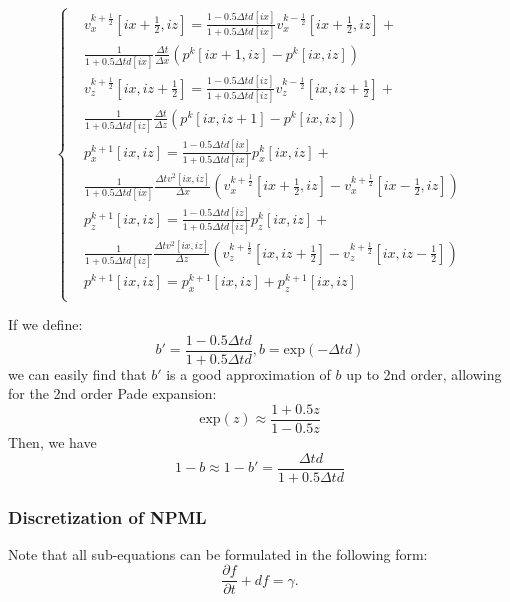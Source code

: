 \begin{equation}
\left\{
\begin{split}
&v_x^{k+\frac{1}{2}}[ix+\frac{1}{2},iz]=\frac{1-0.5\Delta td[ix]}{1+0.5\Delta t d[ix]}v_x^{k-\frac{1}{2}}[ix+\frac{1}{2},iz]+\\
&\frac{1}{1+0.5\Delta t d[ix]}\frac{\Delta t }{\Delta x}(p^k[ix+1,iz]-p^k[ix,iz])\\
&v_z^{k+\frac{1}{2}}[ix,iz+\frac{1}{2}]=\frac{1-0.5\Delta td[iz]}{1+0.5\Delta t d[iz]}v_z^{k-\frac{1}{2}}[ix,iz+\frac{1}{2}]+\\
&\frac{1}{1+0.5\Delta t d[iz]}\frac{\Delta t }{\Delta z}(p^k[ix,iz+1]-p^k[ix,iz])\\
&p_x^{k+1}[ix,iz]=\frac{1-0.5\Delta td[ix]}{1+0.5\Delta t d[ix]}p_x^{k}[ix,iz]+\\
&\frac{1}{1+0.5\Delta t d[ix]}\frac{\Delta t v^2[ix,iz]}{\Delta x}(v_x^{k+\frac{1}{2}}[ix+\frac{1}{2},iz]-v_x^{k+\frac{1}{2}}[ix-\frac{1}{2},iz])\\
&p_z^{k+1}[ix,iz]=\frac{1-0.5\Delta td[iz]}{1+0.5\Delta t d[iz]}p_z^{k}[ix,iz]+\\
&\frac{1}{1+0.5\Delta t d[iz]}\frac{\Delta t v^2[ix,iz]}{\Delta z}(v_z^{k+\frac{1}{2}}[ix,iz+\frac{1}{2}]-v_z^{k+\frac{1}{2}}[ix,iz-\frac{1}{2}])\\
&p^{k+1}[ix,iz]=p_x^{k+1}[ix,iz]+p_z^{k+1}[ix,iz]\\
\end{split}
\right.
\end{equation}

If we define: 
\begin{equation}
 b'=\frac{1-0.5\Delta t d}{1+0.5\Delta t d}, b=\mathrm{exp}(-\Delta t d)
\end{equation}
we can easily find that $b'$ is a good approximation of $b$ up to 2nd order, allowing for the 2nd order Pade expansion:
\begin{equation}
 \mathrm{exp}(z)\approx \frac{1+0.5z}{1-0.5z}
\end{equation}
Then, we have
\begin{equation}
1-b\approx 1-b'=\frac{\Delta t d}{1+0.5\Delta t d}
\end{equation}





\subsubsection{Discretization of NPML}

Note that all sub-equations can be formulated in the following form:
\begin{equation}
\frac{\partial f}{\partial t}+d f=\gamma.
\end{equation}

